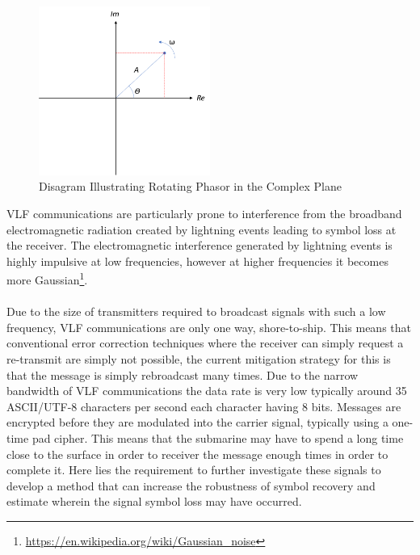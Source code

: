 \begin{figure}[h!]
    \centering
    \includegraphics[width = 0.5\textwidth]{figs/phasor.png}
    \caption{Disagram Illustrating Rotating Phasor in the Complex Plane}
    \label{fig:phasor}
\end{figure}

\pagebreak
VLF communications are particularly prone to interference from the broadband electromagnetic radiation created by lightning events leading to symbol loss at the receiver. The electromagnetic interference generated by lightning events is highly impulsive at low frequencies, however at higher frequencies it becomes more Gaussian\footnote{\hyperlink{https://en.wikipedia.org/wiki/Gaussian_noise}{https://en.wikipedia.org/wiki/Gaussian\_noise}}. 
\\\\
Due to the size of transmitters required to broadcast signals with such a low frequency, VLF communications are only one way, shore-to-ship. This means that conventional error correction techniques where the receiver can simply request a re-transmit are simply not possible, the current mitigation strategy for this is that the message is simply rebroadcast many times. Due to the narrow bandwidth of VLF communications the data rate is very low typically around 35 ASCII/UTF-8 characters per second each character having 8 bits. Messages are encrypted before they are modulated into the carrier signal, typically using a one-time pad cipher. This means that the submarine may have to spend a long time close to the surface in order to receiver the message enough times in order to complete it. Here lies the requirement to further investigate these signals to develop a method that can increase the robustness of symbol recovery and estimate wherein the signal symbol loss may have occurred. 

